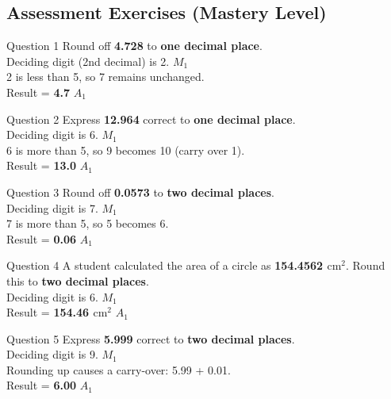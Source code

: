 \documentclass[12pt, a4paper, oneside]{article}
\begin{document}
\subsection*{Assessment Exercises (Mastery Level)}

\begin{solvingbox}{Question 1}
Round off \textbf{4.728} to \textbf{one decimal place}. \\
Deciding digit (2nd decimal) is 2. \hfill $M_1$ \\
2 is less than 5, so 7 remains unchanged. \\
Result = \textbf{4.7} \hfill $A_1$
\end{solvingbox}

\begin{solvingbox}{Question 2}
Express \textbf{12.964} correct to \textbf{one decimal place}. \\
Deciding digit is 6. \hfill $M_1$ \\
6 is more than 5, so 9 becomes 10 (carry over 1). \\
Result = \textbf{13.0} \hfill $A_1$
\end{solvingbox}

\begin{solvingbox}{Question 3}
Round off \textbf{0.0573} to \textbf{two decimal places}. \\
Deciding digit is 7. \hfill $M_1$ \\
7 is more than 5, so 5 becomes 6. \\
Result = \textbf{0.06} \hfill $A_1$
\end{solvingbox}

\begin{solvingbox}{Question 4}
A student calculated the area of a circle as \textbf{154.4562 $\text{cm}^2$}. Round this to \textbf{two decimal places}. \\
Deciding digit is 6. \hfill $M_1$ \\
Result = \textbf{154.46 $\text{cm}^2$} \hfill $A_1$
\end{solvingbox}

\begin{solvingbox}{Question 5}
Express \textbf{5.999} correct to \textbf{two decimal places}. \\
Deciding digit is 9. \hfill $M_1$ \\
Rounding up causes a carry-over: 5.99 + 0.01. \\
Result = \textbf{6.00} \hfill $A_1$
\end{solvingbox}
\end{document}
